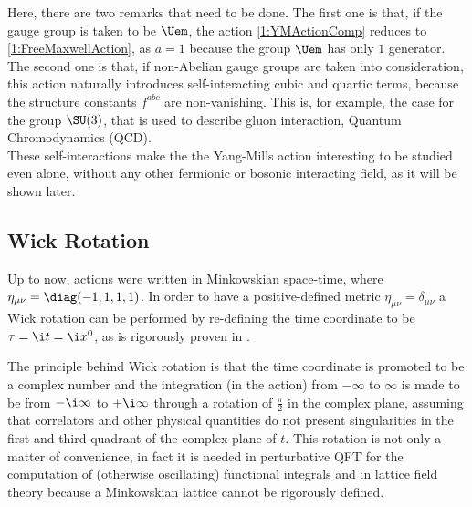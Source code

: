 Here, there are two remarks that need to be done.
The first one is that, if the gauge group is taken to be $\Uem$, the action \eqref{1:YMActionComp} reduces to \eqref{1:FreeMaxwellAction}, as $a=1$ because the group $\Uem$ has only $1$ generator.\\
The second one is that, if non-Abelian gauge groups are taken into consideration, this action naturally introduces self-interacting cubic and quartic terms, because the structure constants $f^{abc}$ are non-vanishing. This is, for example, the case for the group $\SU(3)$, that is used to describe gluon interaction, \ie Quantum Chromodynamics (QCD).\\
These self-interactions make the the Yang-Mills action interesting to be studied even alone, without any other fermionic or bosonic interacting field, as it will be shown later.
\begin{comment}
\\Everything that has been said for $\SUN$ can be also extended to $\mathit{SO}(N)$ by replacing \emph{unitary} with \emph{orthogonal} and \emph{traceless} with \emph{antisymmetric}. In fact, this discussion can be made for every compact\footnote{Compactness, \ie $\Tr{T^aT^b}$ positive defined, is required in order to have a bounded from below Hamiltonian.} group, such as the symplectic group $\mathit{Sp}(2N)$ and the five exceptional Lie groups $\mathit{G}(2)$, $\spF$, $\mathit{E}(6)$, $\mathit{E}(7)$ and $\mathit{E}(8)$.
\end{comment}

\subsection{Wick Rotation}
Up to now, actions were written in Minkowskian space-time, where $\eta_{\mu\nu} = \diag(-1,1,1,1)$.
In order to have a positive-defined metric $\eta_{\mu\nu} = \delta_{\mu\nu}$ a Wick rotation can be performed by re-defining the time coordinate to be $\tau = \i t = \i x^0$, as is rigorously proven in \cite{SCHLINGEMANN_1999}.

The principle behind Wick rotation is that the time coordinate is promoted to be a complex number and the integration (in the action) from $-\infty$ to $\infty$ is made to be from $-\i\infty$ to $+\i\infty$ through a rotation of $\frac\pi2$ in the complex plane, assuming that correlators and other physical quantities do not present singularities in the first and third quadrant of the complex plane of $t$.
This rotation is not only a matter of convenience, in fact it is needed in perturbative QFT for the computation of (otherwise oscillating) functional integrals and in lattice field theory because a Minkowskian lattice cannot be rigorously defined.


